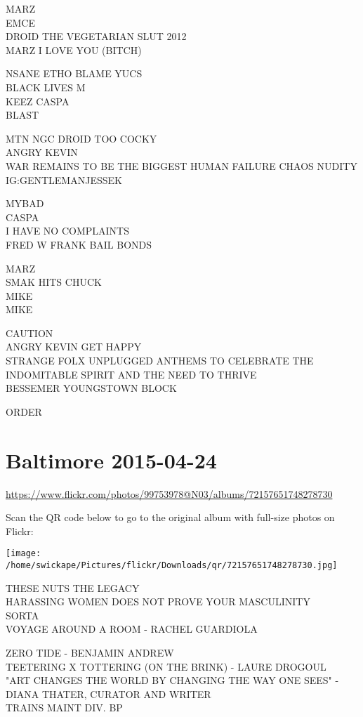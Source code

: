 \documentclass[10pt,letterpaper]{article}
\begin{document}
MARZ\\
EMCE\\
DROID THE VEGETARIAN SLUT 2012\\
MARZ I LOVE YOU (BITCH)

NSANE ETHO BLAME YUCS\\
BLACK LIVES M\\
KEEZ CASPA\\
BLAST

MTN NGC DROID TOO COCKY\\
ANGRY KEVIN\\
WAR REMAINS TO BE THE BIGGEST HUMAN FAILURE CHAOS NUDITY\\
IG:GENTLEMANJESSEK

MYBAD\\
CASPA\\
I HAVE NO COMPLAINTS\\
FRED W FRANK BAIL BONDS

MARZ\\
SMAK HITS CHUCK\\
MIKE\\
MIKE

CAUTION\\
ANGRY KEVIN GET HAPPY\\
STRANGE FOLX UNPLUGGED ANTHEMS TO CELEBRATE THE INDOMITABLE SPIRIT AND THE NEED TO THRIVE\\
BESSEMER YOUNGSTOWN BLOCK

ORDER


\section*{Baltimore 2015-04-24}

\url{https://www.flickr.com/photos/99753978@N03/albums/72157651748278730}

Scan the QR code below to go to the original album with full-size photos on Flickr:

\texttt{[image: /home/swickape/Pictures/flickr/Downloads/qr/72157651748278730.jpg]}


THESE NUTS THE LEGACY\\
HARASSING WOMEN DOES NOT PROVE YOUR MASCULINITY\\
SORTA\\
VOYAGE AROUND A ROOM {-} RACHEL GUARDIOLA

ZERO TIDE {-} BENJAMIN ANDREW\\
TEETERING X TOTTERING (ON THE BRINK) {-} LAURE DROGOUL\\
"ART CHANGES THE WORLD BY CHANGING THE WAY ONE SEES" {-} DIANA THATER, CURATOR AND WRITER\\
TRAINS MAINT DIV. BP
\end{document}
